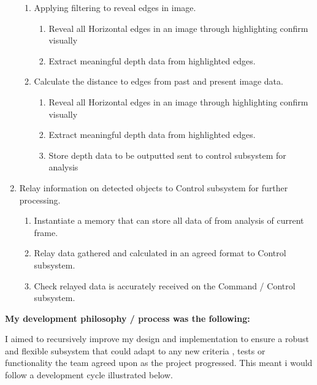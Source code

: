\documentclass[10pt,twoside]{article}
\begin{document}
\begin{enumerate}
        \begin{enumerate}
            \itemsep-0.2em
            \item Applying filtering to reveal edges in image.
                \begin{enumerate}
                    \itemsep-0.2em
                    \item Reveal all Horizontal edges in an image through highlighting confirm visually
                    \item Extract meaningful depth data from highlighted edges. 
                \end{enumerate}
            \item Calculate the distance to edges from past and present image data.
                 \begin{enumerate}
                    \itemsep-0.2em
                    \item Reveal all Horizontal edges in an image through highlighting confirm visually
                    \item Extract meaningful depth data from highlighted edges. 
                    \item Store depth data to be outputted sent to control subsystem for analysis
                \end{enumerate}
        \end{enumerate}
  \item Relay information on detected objects to Control subsystem for further processing.
        \begin{enumerate}
            \itemsep-0.2em
            \item Instantiate a memory that can store all data of from analysis of current frame. 
            \item Relay data gathered and calculated in an agreed format to Control subsystem.
            \item Check relayed data is accurately received on the Command / Control subsystem. 
        \end{enumerate}
\end{enumerate}

\textbf{My development philosophy / process was the following:}

I aimed to recursively improve my design and implementation to ensure a robust and flexible subsystem that could adapt to any new criteria , tests or functionality the team agreed upon as the project progressed. This meant i would follow a development cycle illustrated below.
\end{document}
